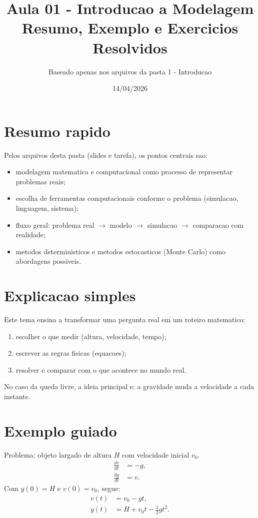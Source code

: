 \documentclass[12pt,a4paper]{article}
\title{Aula 01 - Introducao a Modelagem\\Resumo, Exemplo e Exercicios Resolvidos}
\author{Baseado apenas nos arquivos da pasta 1 - Introducao}
\date{14/04/2026}
\begin{document}
\maketitle

\section{Resumo rapido}
Pelos arquivos desta pasta (slides e tarefa), os pontos centrais sao:
\begin{itemize}
  \item modelagem matematica e computacional como processo de representar problemas reais;
  \item escolha de ferramentas computacionais conforme o problema (simulacao, linguagem, sistema);
  \item fluxo geral: problema real $\to$ modelo $\to$ simulacao $\to$ comparacao com realidade;
  \item metodos deterministicos e metodos estocasticos (Monte Carlo) como abordagens possiveis.
\end{itemize}

\section{Explicacao simples}
Este tema ensina a transformar uma pergunta real em um roteiro matematico:
\begin{enumerate}
  \item escolher o que medir (altura, velocidade, tempo);
  \item escrever as regras fisicas (equacoes);
  \item resolver e comparar com o que acontece no mundo real.
\end{enumerate}
No caso da queda livre, a ideia principal e: a gravidade muda a velocidade a cada instante.

\section{Exemplo guiado}
Problema: objeto largado de altura $H$ com velocidade inicial $v_0$.
\begin{align}
\frac{dv}{dt} &= -g, \\
\frac{dy}{dt} &= v.
\end{align}
Com $y(0)=H$ e $v(0)=v_0$, segue:
\begin{align}
v(t) &= v_0-gt, \\
y(t) &= H+v_0t-\frac{1}{2}gt^2.
\end{align}
\end{document}
